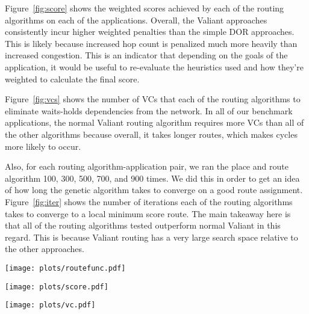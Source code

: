 Figure~\ref{fig:score} shows the weighted scores achieved by each of the routing algorithms on each of the applications. Overall, the Valiant approaches consistently incur higher weighted penalties than the simple DOR approaches. This is likely because increased hop count is penalized much more heavily than increased congestion. This is an indicator that depending on the goals of the application, it would be useful to re-evaluate the heuristics used and how they're weighted to calculate the final score.

Figure~\ref{fig:vcs} shows the number of VCs that each of the routing algorithms to eliminate waits-holds dependencies from the network. In all of our benchmark applications, the normal Valiant routing algorithm requires more VCs than all of the other algorithms because overall, it takes longer routes, which makes cycles more likely to occur.

Also, for each routing algorithm-application pair, we ran the place and route algorithm 100, 300, 500, 700, and 900 times. We did this in order to get an idea of how long the genetic algorithm takes to converge on a good route assignment. Figure~\ref{fig:iter} shows the number of iterations each of the routing algorithms takes to converge to a local minimum score route. The main takeaway here is that all of the routing algorithms tested outperform normal Valiant in this regard. This is because Valiant routing has a very large search space relative to the other approaches.  
\begin{figure*}
  \texttt{[image: plots/routefunc.pdf]}
  \caption{The raw routing statistics for each route.}
  \label{fig:routefunc}
\end{figure*}
\begin{figure*}
  \texttt{[image: plots/score.pdf]}
  \caption{The computed scores for each route.}
  \label{fig:score}
\end{figure*}
\begin{figure*}
  \texttt{[image: plots/vc.pdf]}
  \caption{The VCs required by our allocation algorithm for each routing function.}
  \label{fig:vcs}
\end{figure*}

